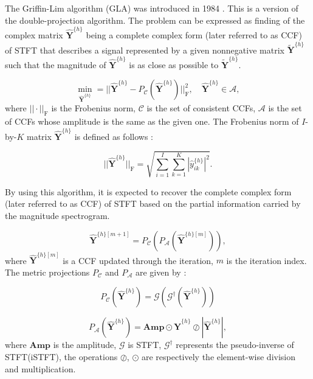 \documentclass[3p,12pt]{elsarticle}
\begin{document}
The Griffin-Lim algorithm (GLA) was introduced in 1984 \cite{griffin1984signal}. This is a version of the double-projection algorithm. The problem can be expressed as finding of the complex matrix $\mathbf{\widehat{Y}}^{\{h\}}$ being a complete complex form (later referred to as CCF) of STFT that describes a signal represented by a given nonnegative matrix $\widetilde{\mathbf{Y}}^{\{h\}}$ such that the magnitude of $\mathbf{\widehat{Y}}^{\{h\}}$ is as close as possible to $\widetilde{\mathbf{Y}}^{\{h\}}$.

\begin{equation}
  \min_{\mathbf{\widehat{Y}}^{\{h\}}} = || \mathbf{\widehat{Y}}^{\{h\}} -  P_\mathcal{C}(\mathbf{\widehat{Y}}^{\{h\}}) ||_{\text{F}}^2, \quad \mathbf{\widehat{Y}}^{\{h\}}\in \mathcal{A},
\end{equation}
where $|| \cdot ||_{\text{F}}$ is the Frobenius norm, $\mathcal{C}$ is the set of consistent CCFs, $\mathcal{A}$ is the set of CCFs whose amplitude is the same as the given one. The Frobenius norm of $I$-by-$K$ matrix $\mathbf{\widehat{Y}}^{\{h\}}$ is defined as follows \cite{masuyama2019deep}:

\begin{equation}
 || \mathbf{\widehat{Y}}^{\{h\}} ||_{\text{F}} = \sqrt{\sum_{i=1}^I \sum_{k=1}^K |\widehat{y}^{\{h\}}_{ik}|^2 }.
\end{equation}

By using this algorithm, it is expected to recover the complete complex form (later referred to as CCF) of STFT based on the partial information carried by the magnitude spectrogram. 

\begin{equation}
   \mathbf{\widehat{Y}}^{\{h\}[m+1]} = P_\mathcal{C}(P_\mathcal{A}(\mathbf{\widehat{Y}}^{\{h\}[m]})),
\end{equation}
where $\mathbf{\widehat{Y}}^{\{h\}[m]}$ is a CCF updated through the iteration, $m$ is the iteration index. The metric projections $P_\mathcal{C}$ and $P_\mathcal{A}$ are given by \cite{masuyama2019deep}:

\begin{equation}
   P_\mathcal{C}(\mathbf{\widehat{Y}}^{\{h\}}) = \mathcal{G}(\mathcal{G^\dag}(\mathbf{\widehat{Y}}^{\{h\}}))
\end{equation}

\begin{equation}
   P_\mathcal{A}(\mathbf{\widehat{Y}}^{\{h\}}) = \textbf{Amp} \odot \mathbf{\widehat{Y}}^{\{h\}} \oslash |\mathbf{\widehat{Y}}^{\{h\}}|,
\end{equation}
where $\textbf{Amp}$ is the amplitude, $\mathcal{G}$ is STFT, $\mathcal{G^\dag}$ represents the pseudo-inverse of STFT(iSTFT), the operations $\oslash$, $\odot$  are respectively the element-wise division and multiplication. 
\end{document}
